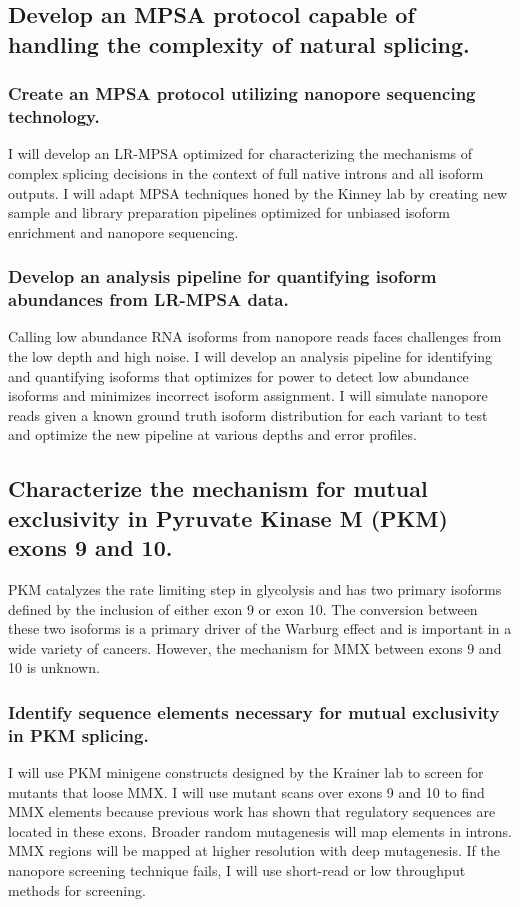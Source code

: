\documentclass{article}
\begin{document}
\subsection{Develop an MPSA protocol capable of handling the complexity of natural splicing.} \label{aim:MPSA_dev}
%
\subsubsection{Create an MPSA protocol utilizing nanopore sequencing technology.} \label{aim:nanopore_screen_dev}
I will develop an LR-MPSA optimized for characterizing the mechanisms of complex splicing decisions in the context of full native introns and all isoform outputs.
I will adapt MPSA techniques honed by the Kinney lab\supercite{Wong2018-vq,Ishigami2022-bf} by creating new sample and library preparation pipelines optimized for unbiased isoform enrichment and nanopore sequencing.
%
\subsubsection{Develop an analysis pipeline for quantifying isoform abundances from LR-MPSA data.} \label{aim:pipeline_dev}
Calling low abundance RNA isoforms from nanopore reads faces challenges from the low depth and high noise.
I will develop an analysis pipeline for identifying and quantifying isoforms that optimizes for power to detect low abundance isoforms and minimizes incorrect isoform assignment.
I will simulate nanopore reads given a known ground truth isoform distribution for each variant to test and optimize the new pipeline at various depths and error profiles.
%
\subsection{Characterize the mechanism for mutual exclusivity in Pyruvate Kinase M (PKM) exons 9 and 10.}
PKM catalyzes the rate limiting step in glycolysis and has two primary isoforms defined by the inclusion of either exon 9 or exon 10. 
The conversion between these two isoforms is a primary driver of the Warburg effect and is important in a wide variety of cancers.\supercite{Christofk2008-bu,Ma2022-dt} 
However, the mechanism for MMX between exons 9 and 10 is unknown.
%
\subsubsection{Identify sequence elements necessary for mutual exclusivity in PKM splicing.} \label{aim:PKM_motif_finding}
I will use PKM minigene constructs designed by the Krainer lab \supercite{Wang2012-dr} to screen for mutants that loose MMX.
I will use mutant scans over exons 9 and 10 to find MMX elements because previous work has shown that regulatory sequences are located in these exons.\supercite{Wang2012-dr} 
Broader random mutagenesis will map elements in introns.
MMX regions will be mapped at higher resolution with deep mutagenesis.
If the nanopore screening technique fails, I will use short-read or low throughput methods for screening.
%
\end{document}
